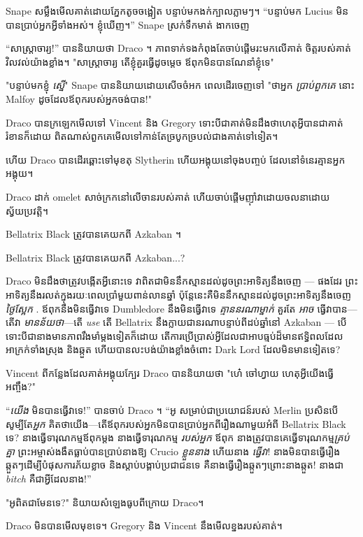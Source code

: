 {Snape សម្លឹងមើលគាត់ដោយភ្នែកតូចចង្អៀត បន្ទាប់មកងក់ក្បាលភ្លាមៗ។ “បន្ទាប់មក Lucius មិនបានប្រាប់អ្នកអ្វីទាំងអស់។ ខ្ញុំឃើញ។” Snape ស្រក់ទឹកមាត់ ងាកចេញ

“សាស្រ្តាចារ្យ!” បាននិយាយថា Draco ។ ភាព​ទាក់​ទង​កំពុង​តែ​ចាប់​ផ្ដើម​រះ​មក​លើ​គាត់ ចិត្ត​របស់​គាត់​វិល​វល់​យ៉ាង​ខ្លាំង។ "សាស្រ្តាចារ្យ តើខ្ញុំគួរធ្វើដូចម្តេច ឪពុកមិនបានណែនាំខ្ញុំទេ"

"បន្ទាប់មកខ្ញុំ \emph{ស្នើ}" Snape បាននិយាយដោយសើចចំអក ពេលដើរចេញទៅ "ថាអ្នក \emph{ប្រាប់ពួកគេ} នោះ Malfoy ដូចដែលឪពុករបស់អ្នកចង់បាន!"

Draco បានក្រឡេកមើលទៅ Vincent និង Gregory ទោះបីជាគាត់មិនដឹងថាហេតុអ្វីបានជាគាត់រំខានក៏ដោយ ពិតណាស់ពួកគេមើលទៅកាន់តែច្របូកច្របល់ជាងគាត់ទៅទៀត។

ហើយ Draco បានដើរឆ្ពោះទៅមុខតុ Slytherin ហើយអង្គុយនៅចុងបញ្ចប់ ដែលនៅទំនេរគ្មានអ្នកអង្គុយ។

Draco ដាក់ omelet សាច់ក្រកនៅលើចានរបស់គាត់ ហើយចាប់ផ្តើមញ៉ាំវាដោយចលនាដោយស្វ័យប្រវត្តិ។

Bellatrix Black ត្រូវបានគេយកពី Azkaban ។

Bellatrix Black ត្រូវបានគេយកពី Azkaban...?

Draco មិនដឹងថាត្រូវបង្កើតអ្វីនោះទេ វាពិតជាមិននឹកស្មានដល់ដូចព្រះអាទិត្យនឹងចេញ — ផងដែរ ព្រះអាទិត្យនឹងរលត់ក្នុងរយៈពេលប្រាំមួយពាន់លានឆ្នាំ ប៉ុន្តែនេះគឺមិននឹកស្មានដល់ដូចព្រះអាទិត្យនឹងចេញ\emph{ថ្ងៃស្អែក} . ឪពុកនឹងមិនធ្វើវាទេ Dumbledore នឹងមិនធ្វើវាទេ \emph{គ្មាននរណាម្នាក់} គួរតែ \emph{អាច} ធ្វើវាបាន—តើវា \emph{មានន័យថា}—តើ \emph{use} តើ Bellatrix នឹងក្លាយជានរណាបន្ទាប់ពីដប់ឆ្នាំនៅ Azkaban — បើទោះបីជានាងមានភាពរឹងមាំម្តងទៀតក៏ដោយ តើការប្រើប្រាស់អ្វីដែលជាអាបធ្មប់ដ៏មានឥទ្ធិពលដែលអាក្រក់ទាំងស្រុង និងឆ្កួត ហើយបានលះបង់យ៉ាងខ្លាំងចំពោះ Dark Lord ដែលមិនមានទៀតទេ?

Vincent ពីកន្លែងដែលគាត់អង្គុយក្បែរ Draco បាននិយាយថា "ហេ៎ ចៅហ្វាយ ហេតុអ្វីយើងធ្វើអញ្ចឹង?"

“\emph{យើង} មិន​បាន​ធ្វើ​វា​ទេ!” បានចាប់ Draco ។ “អូ សម្រាប់ជាប្រយោជន៍របស់ Merlin ប្រសិនបើសូម្បីតែ\emph{អ្នក} គិតថាយើង—តើឪពុករបស់អ្នកមិនបានប្រាប់អ្នកពីរឿងណាមួយអំពី Bellatrix Black ទេ? នាងធ្វើទារុណកម្មឪពុកម្តង នាងធ្វើទារុណកម្ម \emph{របស់អ្នក} ឪពុក នាងត្រូវបានគេធ្វើទារុណកម្ម\emph{គ្រប់គ្នា} ព្រះអម្ចាស់ងងឹតធ្លាប់បានប្រាប់នាងឱ្យ Crucio \emph{ខ្លួននាង} ហើយនាង \emph{ធ្វើវា}! នាង​មិន​បាន​ធ្វើ​រឿង​ឆ្កួតៗ​ដើម្បី​បំផុស​ការ​ភ័យ​ខ្លាច និង​ស្តាប់​បង្គាប់​ប្រជាជន​ទេ គឺ​នាង​ធ្វើ​រឿង​ឆ្កួតៗ​ព្រោះ​នាង​ឆ្កួត! នាងជា \emph{bitch} គឺជាអ្វីដែលនាង!”

"អូពិតជាមែនទេ?" និយាយ​សំឡេង​ធូប​ពី​ក្រោយ​ Draco។

Draco មិនបានមើលមុខទេ។ Gregory និង Vincent នឹងមើលខ្នងរបស់គាត់។

}

